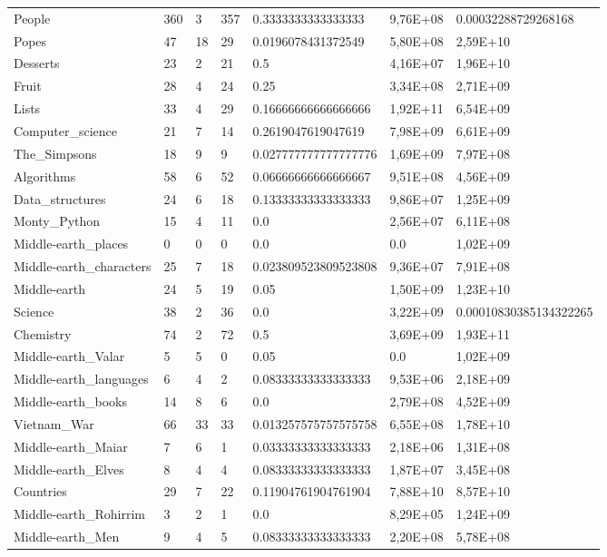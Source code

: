 \begin{longtable}{@{}lllllll@{}}
People & 360 & 3 & 357 & 0.3333333333333333 & 9,76E+08 & 0.00032288729268168 \\
Popes & 47 & 18 & 29 & 0.0196078431372549 & 5,80E+08 & 2,59E+10 \\
Desserts & 23 & 2 & 21 & 0.5 & 4,16E+07 & 1,96E+10 \\
Fruit & 28 & 4 & 24 & 0.25 & 3,34E+08 & 2,71E+09 \\
Lists & 33 & 4 & 29 & 0.16666666666666666 & 1,92E+11 & 6,54E+09 \\
Computer\_science & 21 & 7 & 14 & 0.2619047619047619 & 7,98E+09 & 6,61E+09 \\
The\_Simpsons & 18 & 9 & 9 & 0.027777777777777776 & 1,69E+09 & 7,97E+08 \\
Algorithms & 58 & 6 & 52 & 0.06666666666666667 & 9,51E+08 & 4,56E+09 \\
Data\_structures & 24 & 6 & 18 & 0.13333333333333333 & 9,86E+07 & 1,25E+09 \\
Monty\_Python & 15 & 4 & 11 & 0.0 & 2,56E+07 & 6,11E+08 \\
Middle-earth\_places & 0 & 0 & 0 & 0.0 & 0.0 & 1,02E+09 \\
Middle-earth\_characters & 25 & 7 & 18 & 0.023809523809523808 & 9,36E+07 & 7,91E+08 \\
Middle-earth & 24 & 5 & 19 & 0.05 & 1,50E+09 & 1,23E+10 \\
Science & 38 & 2 & 36 & 0.0 & 3,22E+09 & 0.00010830385134322265 \\
Chemistry & 74 & 2 & 72 & 0.5 & 3,69E+09 & 1,93E+11 \\
Middle-earth\_Valar & 5 & 5 & 0 & 0.05 & 0.0 & 1,02E+09 \\
Middle-earth\_languages & 6 & 4 & 2 & 0.08333333333333333 & 9,53E+06 & 2,18E+09 \\
Middle-earth\_books & 14 & 8 & 6 & 0.0 & 2,79E+08 & 4,52E+09 \\
Vietnam\_War & 66 & 33 & 33 & 0.013257575757575758 & 6,55E+08 & 1,78E+10 \\
Middle-earth\_Maiar & 7 & 6 & 1 & 0.03333333333333333 & 2,18E+06 & 1,31E+08 \\
Middle-earth\_Elves & 8 & 4 & 4 & 0.08333333333333333 & 1,87E+07 & 3,45E+08 \\
Countries & 29 & 7 & 22 & 0.11904761904761904 & 7,88E+10 & 8,57E+10 \\
Middle-earth\_Rohirrim & 3 & 2 & 1 & 0.0 & 8,29E+05 & 1,24E+09 \\
Middle-earth\_Men & 9 & 4 & 5 & 0.08333333333333333 & 2,20E+08 & 5,78E+08 \\

\end{longtable}
